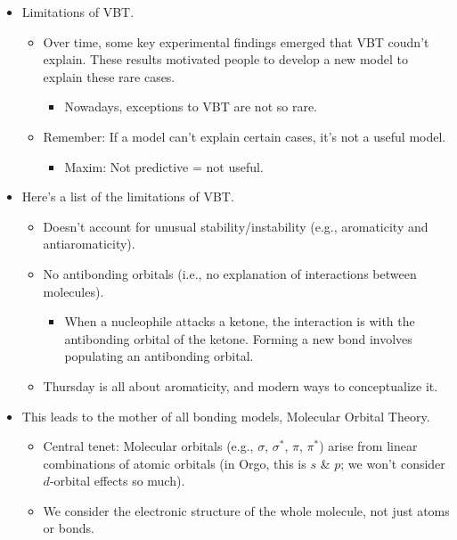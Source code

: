 \documentclass[../notes.tex]{subfiles}
\begin{document}
\begin{itemize}
\begin{itemize}
    \end{itemize}
    \item Limitations of VBT.
    \begin{itemize}
        \item Over time, some key experimental findings emerged that VBT coudn't explain. These results motivated people to develop a new model to explain these rare cases.
        \begin{itemize}
            \item Nowadays, exceptions to VBT are not so rare.
        \end{itemize}
        \item Remember: If a model can't explain certain cases, it's not a useful model.
        \begin{itemize}
            \item Maxim: Not predictive = not useful.
        \end{itemize}
    \end{itemize}
    \item Here's a list of the limitations of VBT.
    \begin{itemize}
        \item Doesn't account for unusual stability/instability (e.g., aromaticity and antiaromaticity).
        \item No antibonding orbitals (i.e., no explanation of interactions between molecules).
        \begin{itemize}
            \item When a nucleophile attacks a ketone, the interaction is with the antibonding orbital of the ketone. Forming a new bond involves populating an antibonding orbital.
        \end{itemize}
        \item Thursday is all about aromaticity, and modern ways to conceptualize it.
    \end{itemize}
    \pagebreak
    \item This leads to the mother of all bonding models, Molecular Orbital Theory.
    \begin{itemize}
        \item Central tenet: Molecular orbitals (e.g., $\sigma$, $\sigma^*$, $\pi$, $\pi^*$) arise from linear combinations of atomic orbitals (in Orgo, this is $s$ \& $p$; we won't consider $d$-orbital effects so much).
        \item We consider the electronic structure of the whole molecule, not just atoms or bonds.
        \begin{itemize}

\end{itemize}
\end{itemize}
\end{itemize}
\end{document}
